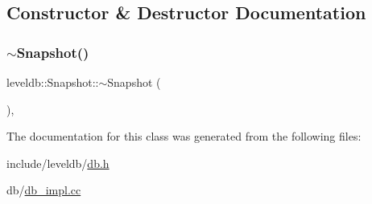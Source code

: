 \subsection{Constructor \& Destructor Documentation}
\mbox{\label{classleveldb_1_1_snapshot_aa09531c67fc12a374f2d872ed2489e6b}} 
\subsubsection{\texorpdfstring{$\sim$Snapshot()}{~Snapshot()}}
{\footnotesize\ttfamily leveldb\+::\+Snapshot\+::$\sim$\+Snapshot (\begin{DoxyParamCaption}{ }\end{DoxyParamCaption})\hspace{0.3cm}{\ttfamily [protected]}, {\ttfamily [virtual]}}



The documentation for this class was generated from the following files\+:\begin{DoxyCompactItemize}
\item 
include/leveldb/\mbox{\hyperlink{db_8h}{db.\+h}}\item 
db/\mbox{\hyperlink{db__impl_8cc}{db\+\_\+impl.\+cc}}\end{DoxyCompactItemize}
